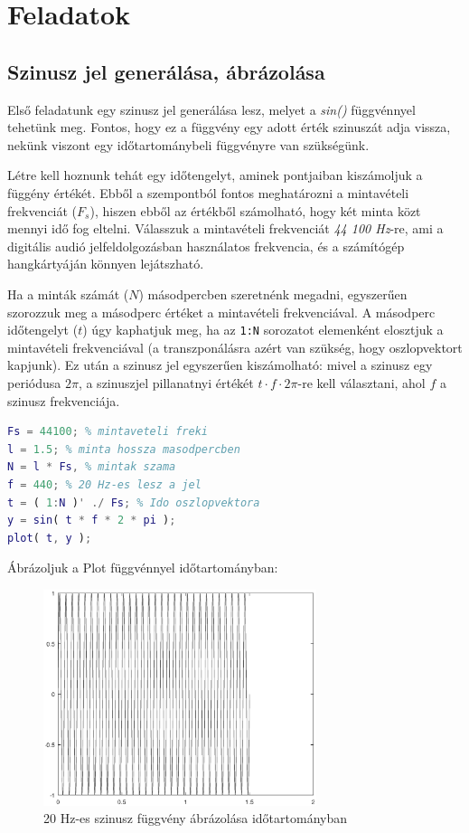\documentclass[12pt,a4paper]{article}
\begin{document}
\section{Feladatok}

\subsection{Szinusz jel generálása, ábrázolása}
Első feladatunk egy szinusz jel generálása lesz, melyet a \textit{sin()} függvénnyel tehetünk meg. Fontos, hogy ez a függvény egy adott érték szinuszát adja vissza, nekünk viszont egy időtartománybeli függvényre van szükségünk. 

Létre kell hoznunk tehát egy időtengelyt, aminek pontjaiban kiszámoljuk a függény értékét. Ebből a szempontból fontos meghatározni a mintavételi frekvenciát ($F_s$), hiszen ebből az értékből számolható, hogy két minta közt mennyi idő fog eltelni. Válasszuk a mintavételi frekvenciát \textit{44 100 Hz}-re, ami a digitális audió jelfeldolgozásban használatos frekvencia, és a számítógép hangkártyáján könnyen lejátszható.

Ha a minták számát ($N$) másodpercben szeretnénk megadni, egyszerűen szorozzuk meg a másodperc értéket a mintavételi frekvenciával. A másodperc időtengelyt ($t$) úgy kaphatjuk meg, ha az \texttt{1:N} sorozatot elemenként elosztjuk a mintavételi frekvenciával (a transzponálásra azért van szükség, hogy oszlopvektort kapjunk). Ez után a szinusz jel egyszerűen kiszámolható: mivel a szinusz egy periódusa $2\pi$, a szinuszjel pillanatnyi értékét $t \cdot f \cdot 2\pi$-re kell választani, ahol $f$ a szinusz frekvenciája.

\begin{lstlisting}[frame=single,language=matlab,caption=Mintavételi frekvencia beállítása és szinuszjel előállítása]
Fs = 44100; % mintaveteli freki
l = 1.5; % minta hossza masodpercben
N = l * Fs, % mintak szama
f = 440; % 20 Hz-es lesz a jel
t = ( 1:N )' ./ Fs; % Ido oszlopvektora
y = sin( t * f * 2 * pi );
plot( t, y );
\end{lstlisting}

Ábrázoljuk a Plot függvénnyel időtartományban:

\begin{figure}[H]
\begin{center}
\includegraphics[width=8cm]{figures/modulaciok_workshop_szinusz.eps}
\caption{20 Hz-es szinusz függvény ábrázolása időtartományban}
\label{fig:szinusz}
\end{center}
\end{figure}
\end{document}
